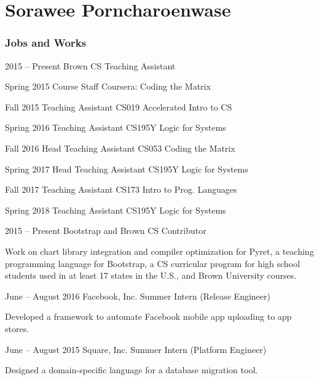 \documentclass{tccv}
\begin{document}
\part{Sorawee Porncharoenwase}

\section{Jobs and Works}

\begin{eventlist}

\item{2015 -- Present}
     {Brown CS}
     {Teaching Assistant}
     
\begin{yearlist}

\item{Spring 2015}
     {Course Staff}
     {Coursera: Coding the Matrix}

\item{Fall 2015}
		 {Teaching Assistant}
		 {CS019 Accelerated Intro to CS}

\item{Spring 2016}
		 {Teaching Assistant}
		 {CS195Y Logic for Systems}

\item{Fall 2016}
		 {Head Teaching Assistant}
		 {CS053 Coding the Matrix}	   

\item{Spring 2017}
	   {Head Teaching Assistant}
	   {CS195Y Logic for Systems}	 
	   
\item{Fall 2017}
		 {Teaching Assistant}
	   {CS173 Intro to Prog. Languages}	 

\item{Spring 2018}
		 {Teaching Assistant}
		 {CS195Y Logic for Systems}	 
\end{yearlist}

\item{2015 -- Present}
     {Bootstrap and Brown CS}
     {Contributor}
     
Work on chart library integration and compiler optimization for Pyret, a teaching programming language for Bootstrap, a CS curricular program for high school students used in at least 17 states in the U.S., and Brown University courses.

\item{June -- August 2016}
{Facebook, Inc.}
{Summer Intern (Release Engineer)}

Developed a framework to automate Facebook \newline mobile app uploading to app stores.

\item{June -- August 2015}
{Square, Inc.}
{Summer Intern (Platform Engineer)}

Designed a domain-specific language for a database migration tool.

\end{eventlist}
\end{document}
